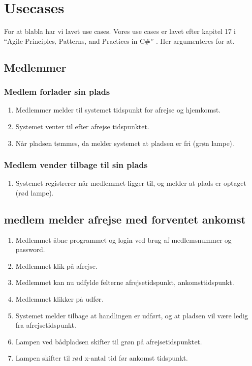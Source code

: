 \section{Usecases}
For at blabla har vi lavet use cases. Vores use cases er lavet efter kapitel 17 i “Agile Principles, Patterns, and Practices in C\#” \cite{martin2006agile}. Her argumenteres for at.

\subsection{Medlemmer}

    \subsubsection{Medlem forlader sin plads}

    \begin{enumerate}
      \item Medlemmer melder til systemet tidspunkt for afrejse og hjemkomst.
      \item Systemet venter til efter afrejse tidspunktet.
      \item Når pladsen tømmes, da melder systemet at pladsen er fri (grøn lampe).
    \end{enumerate}

        \subsubsection{Medlem vender tilbage til sin plads}

    \begin{enumerate}
      \item Systemet registrerer når medlemmet ligger til, og melder at plads er optaget (rød lampe).
    \end{enumerate}

	\subsection{medlem melder afrejse med forventet ankomst}

	\begin{enumerate}
	\item Medlemmet åbne programmet og login ved brug af medlemsnummer og password.
	\item Medlemmet klik på afrejse.
	\item Medlemmet kan nu udfylde felterne afrejsetidspunkt, ankomsttidspunkt.
	\item Medlemmet klikker på udfør.
	\item Systemet melder tilbage at handlingen er udført, og at pladsen vil være ledig fra afrejsetidspunkt.
	\item Lampen ved bådpladsen skifter til grøn på afrejsetidspunktet.
	\item Lampen skifter til rød x-antal tid før ankomst tidspunkt.	
	\end{enumerate}

